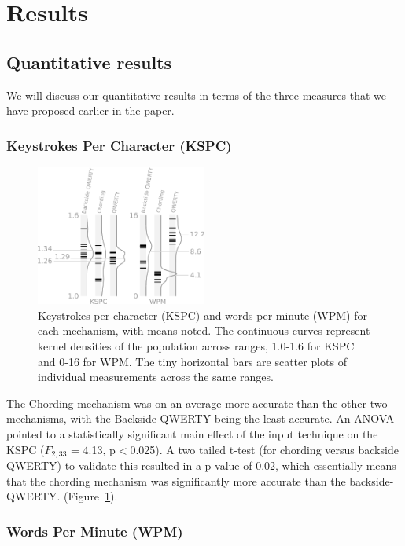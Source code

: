 \section{Results}
\subsection{Quantitative results}

We will discuss our quantitative results in terms of the three measures that we have proposed earlier in the paper.

\subsubsection{Keystrokes Per Character (KSPC)}

\begin{figure}
    \includegraphics[width=0.5\textwidth]{Figures/kspc_and_wpm.pdf} 
    \caption{Keystrokes-per-character (KSPC) and words-per-minute (WPM) for each mechanism, with means noted. The continuous curves represent kernel densities of the population across ranges, 1.0-1.6 for KSPC and 0-16 for WPM. The tiny horizontal bars are scatter plots of individual measurements across the same ranges.}
    \label{fig:kspc_and_wpm}
\end{figure}
The Chording mechanism was on an average more accurate than the other two mechanisms, with the Backside QWERTY being the least accurate. An ANOVA pointed to a statistically significant main effect of the input technique on the KSPC ($F_{2,33}$ = 4.13, p$<$0.025). A two tailed t-test (for chording versus backside QWERTY) to validate this resulted in a p-value of 0.02, which essentially means that the chording mechanism was significantly more accurate than the backside-QWERTY. (Figure~\ref{fig:kspc_and_wpm}). 

\subsubsection{Words Per Minute (WPM)}

